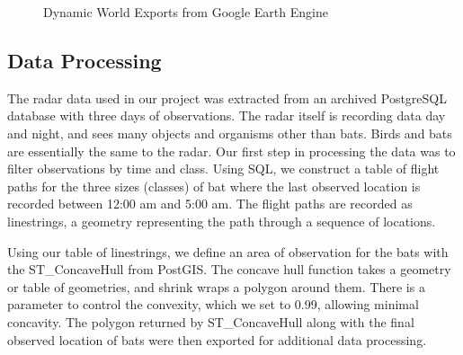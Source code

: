 \documentclass[
  12pt,
  letterpaper,
  DIV=11,
  numbers=noendperiod]{scrartcl}
\begin{document}
\begin{figure}[H]


\caption{\label{fig-dw-lc}Dynamic World Exports from Google Earth
Engine}

\end{figure}%

\subsection{Data Processing}\label{data-processing}

The radar data used in our project was extracted from an archived
PostgreSQL database with three days of observations. The radar itself is
recording data day and night, and sees many objects and organisms other
than bats. Birds and bats are essentially the same to the radar. Our
first step in processing the data was to filter observations by time and
class. Using SQL, we construct a table of flight paths for the three
sizes (classes) of bat where the last observed location is recorded
between 12:00 am and 5:00 am. The flight paths are recorded as
linestrings, a geometry representing the path through a sequence of
locations.

Using our table of linestrings, we define an area of observation for the
bats with the ST\_ConcaveHull from PostGIS. The concave hull function
takes a geometry or table of geometries, and shrink wraps a polygon
around them. There is a parameter to control the convexity, which we set
to 0.99, allowing minimal concavity. The polygon returned by
ST\_ConcaveHull along with the final observed location of bats were then
exported for additional data processing.
\end{document}
